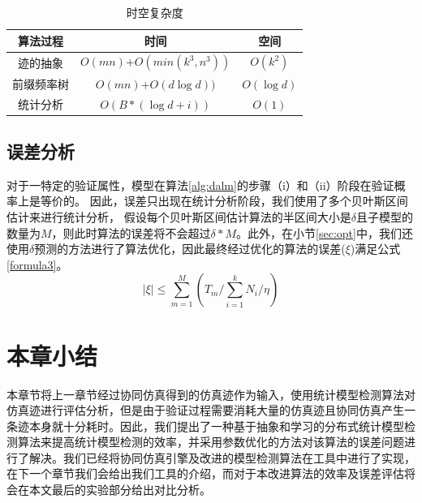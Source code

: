 \begin{table}[t]
	\caption{时空复杂度}
	\label{tb:complexity}
	\centering
	\begin{tabular}{c c c}
	    \hline
		算法过程 & 时间  & 空间 \\
		\hline
		迹的抽象 & $O(mn)$+$O(min(k^3,n^3))$ & $O(k^2)$ \\ 
		\hline
		前缀频率树 &$O(mn)$+$O(d\log{d}))$ & $O(\log{d})$ \\
		\hline
		统计分析 & $O(B*(\log{d}+i))$ & $O(1)$\\	
		\hline
	\end{tabular}
\end{table}

\subsection{误差分析}
对于一特定的验证属性，模型在算法\ref{alg:dalm}的步骤（i）和（ii）阶段在验证概率上是等价的。 因此，误差只出现在统计分析阶段，我们使用了多个贝叶斯区间估计来进行统计分析， 假设每个贝叶斯区间估计算法的半区间大小是$\delta$且子模型的数量为$M$，则此时算法的误差将不会超过$\delta*M$。此外，在小节\ref{sec:opt}中，我们还使用$\delta$预测的方法进行了算法优化，因此最终经过优化的算法的误差($\xi$)满足公式\ref{formula3}。
\begin{equation}
\label{formula3}
| \xi | \leq \sum\limits_{m=1}^M (T_m / \sum\limits_{i=1}^k N_i / \eta)
\end{equation}
\section{本章小结}
本章节将上一章节经过协同仿真得到的仿真迹作为输入，使用统计模型检测算法对仿真迹进行评估分析，但是由于验证过程需要消耗大量的仿真迹且协同仿真产生一条迹本身就十分耗时。因此，我们提出了一种基于抽象和学习的分布式统计模型检测算法来提高统计模型检测的效率，并采用参数优化的方法对该算法的误差问题进行了解决。我们已经将协同仿真引擎及改进的模型检测算法在工具中进行了实现，在下一个章节我们会给出我们工具的介绍，而对于本改进算法的效率及误差评估将会在本文最后的实验部分给出对比分析。
